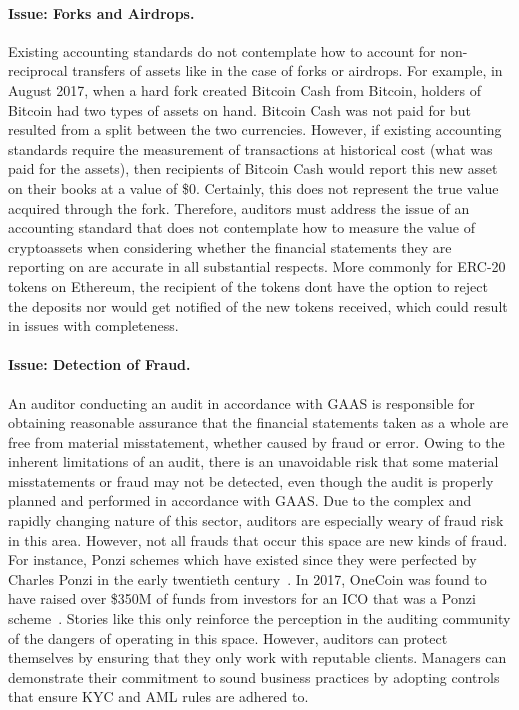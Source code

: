 \paragraph{Issue: Forks and Airdrops.} Existing accounting standards do not contemplate how to account for non-reciprocal transfers of assets like in the case of forks or airdrops. For example, in August 2017, when a hard fork created Bitcoin Cash from Bitcoin, holders of Bitcoin had two types of assets on hand. Bitcoin Cash was not paid for but resulted from a split between the two currencies. However, if existing accounting standards require the measurement of transactions at historical cost (what was paid for the assets), then recipients of Bitcoin Cash would report this new asset on their books at a value of \$0. Certainly, this does not represent the true value acquired through the fork. Therefore, auditors must address the issue of an accounting standard that does not contemplate how to measure the value of cryptoassets when considering whether the financial statements they are reporting on are accurate in all substantial respects. More commonly for ERC-20 tokens on Ethereum, the recipient of the tokens don\textquotesingle t have the option to reject the deposits nor would get notified of the new tokens received, which could result in issues with completeness. 

\paragraph{Issue: Detection of Fraud.} An auditor conducting an audit in accordance with GAAS is responsible for obtaining reasonable assurance that the financial statements taken as a whole are free from material misstatement, whether caused by fraud or error. Owing to the inherent limitations of an audit, there is an unavoidable risk that some material misstatements or fraud may not be detected, even though the audit is properly planned and performed in accordance with GAAS. Due to the complex and rapidly changing nature of this sector, auditors are especially weary of fraud risk in this area. 
However, not all frauds that occur this space are new kinds of fraud. For instance, Ponzi schemes which have existed since they were perfected by Charles Ponzi in the early twentieth century~\cite{ponzi2001rise}. In 2017, OneCoin was found to have raised over \$350M of funds from investors for an ICO that was a Ponzi scheme~\cite{atlanticCryptoPonzi2017}. Stories like this only reinforce the perception in the auditing community of the dangers of operating in this space. However, auditors can protect themselves by ensuring that they only work with reputable clients. Managers can demonstrate their commitment to sound business practices by adopting controls that ensure KYC and AML rules are adhered to.

